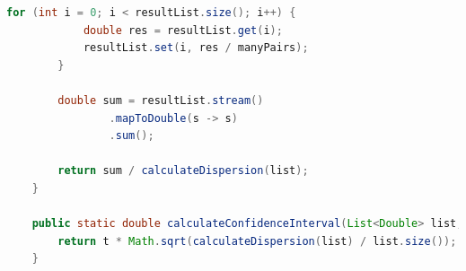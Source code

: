 \documentclass[a4paper,12pt]{article}
\begin{document}
\begin{lstlisting}[language=Java, title=Рассчет и отображение параметров распределения]
        for (int i = 0; i < resultList.size(); i++) {
            double res = resultList.get(i);
            resultList.set(i, res / manyPairs);
        }

        double sum = resultList.stream()
                .mapToDouble(s -> s)
                .sum();

        return sum / calculateDispersion(list);
    }

    public static double calculateConfidenceInterval(List<Double> list, Double t) {
        return t * Math.sqrt(calculateDispersion(list) / list.size());
    }

\end{lstlisting}
\end{document}
